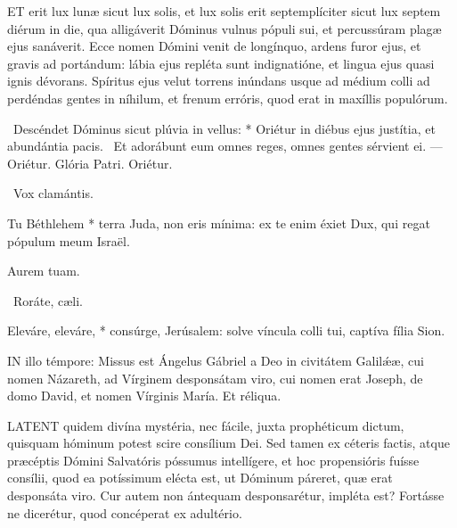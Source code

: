 
\lettrine[lines=2]{E}{T} erit lux lunæ sicut lux solis, et lux solis erit septemplíciter sicut lux septem diérum in die, qua alligáverit Dóminus vulnus pópuli sui, et percussúram plagæ ejus sanáverit. Ecce nomen Dómini venit de longínquo, ardens furor ejus, et gravis ad portándum: lábia ejus repléta sunt indignatióne, et lingua ejus quasi ignis dévorans. Spíritus ejus velut torrens inúndans usque ad médium colli ad perdéndas gentes in níhilum, et frenum erróris, quod erat in maxíllis populórum.

\R\ Descéndet Dóminus sicut plúvia in vellus: * Oriétur in diébus ejus justítia, et abundántia pacis. \V\ Et adorábunt eum omnes reges, omnes gentes sérvient ei. --- Oriétur. Glória Patri. Oriétur.

\V\ Vox clamántis.

 Tu Béthlehem * terra Juda, non eris mínima: ex te enim éxiet Dux, qui regat pópulum meum Israël.

 Aurem tuam. 

\V\ Roráte, cæli.

 Eleváre, eleváre, * consúrge, Jerúsalem: solve víncula colli tui, captíva fília Sion.


\sectionornament





\lettrine[lines=2]{I}{N} illo témpore: Missus est Ángelus Gábriel a Deo in civitátem Galilǽæ, cui nomen Názareth, ad Vírginem desponsátam viro, cui nomen erat Joseph, de domo David, et nomen Vírginis María. Et réliqua.



\lettrine[lines=2]{L}{ATENT} quidem divína mystéria, nec fácile, juxta prophéticum dictum, quisquam hóminum potest scire consílium Dei. Sed tamen ex céteris factis, atque præcéptis Dómini Salvatóris póssumus intellígere, et hoc propensióris fuísse consílii, quod ea potíssimum elécta est, ut Dóminum páreret, quæ erat desponsáta viro. Cur autem non ántequam desponsarétur, impléta est? Fortásse ne dicerétur, quod concéperat ex adultério.

